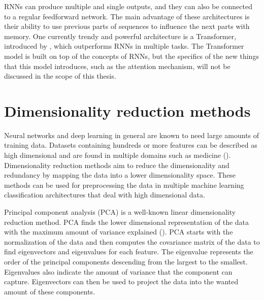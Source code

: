 RNNs can produce multiple and single outputs, and they can also be connected to a regular feedforward network. The main advantage of these architectures is their ability to use previous parts of sequences to influence the next parts with memory. One currently trendy and powerful architecture is a Transformer, introduced by \cite{vaswani2023attention}, which outperforms RNNs in multiple tasks. The Transformer model is built on top of the concepts of RNNs, but the specifics of the new things that this model introduces, such as the attention mechanism, will not be discussed in the scope of this thesis.

\section{Dimensionality reduction methods}

Neural networks and deep learning in general are known to need large amounts of training data. Datasets containing hundreds or more features can be described as high dimensional and are found in multiple domains such as medicine (\cite{dimredbig}). Dimensionality reduction methods aim to reduce the dimensionality and redundancy by mapping the data into a lower dimensionality space. These methods can be used for preprocessing the data in multiple machine learning classification architectures that deal with high dimensional data.

Principal component analysis (PCA) is a well-known linear dimensionality reduction method. PCA finds the lower dimensional representation of the data with the maximum amount of variance explained (\cite{van2009dimensionality}). PCA starts with the normalization of the data and then computes the covariance matrix of the data to find eigenvectors and eigenvalues for each feature. The eigenvalue represents the order of the principal components descending from the largest to the smallest. Eigenvalues also indicate the amount of variance that the component can capture. Eigenvectors can then be used to project the data into the wanted amount of these components. 

